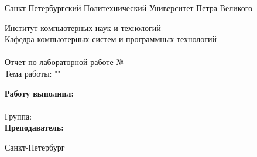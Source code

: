 
\begin{titlepage}	%
	\begin{center}		%
		\large Санкт-Петербургский Политехнический Университет Петра Великого\\
 		\begin{center}
 		\underline{\hspace{30em}}
 		\end{center}
		\large Институт компьютерных наук и технологий \\
		\large Кафедра компьютерных систем и программных технологий\\[6cm]
		\huge \subjectName \\[0.5cm] %
		\large Отчет по лабораторной работе №\workNumber \\[0.1cm]
		\large Тема работы: "\titleName "\\[5cm]
	\end{center}
	\begin{flushright} %
				\large\textbf{Работу выполнил:}\\
				\large \studentName\\
				\large {Группа:} \groupNumber \\
				\large \textbf{Преподаватель:}\\
				\large \teacherName
	\end{flushright}	
	\vfill %
	\begin{center}
	\large Санкт-Петербург\\
	\large \the\year %
	\end{center} %
\thispagestyle{empty} %
\end{titlepage} %
\vfill %